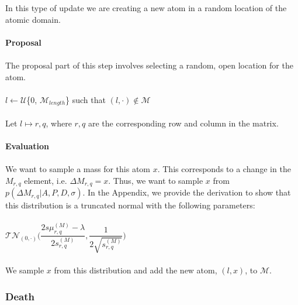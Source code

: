 \documentclass[]{article}
\begin{document}
In this type of update we are creating a new atom in a random location of the atomic domain.\\
\\
\textbf{Proposal}\\
\\
The proposal part of this step involves selecting a random, open location for the atom.\\
\\
$l \leftarrow \mathcal{U}$\{0, $\mathcal{M}_{length}$\} such that $(l, \cdot) \notin \mathcal{M}$\\
\\
Let $l \mapsto r,q$, where $r,q$ are the corresponding row and column in the matrix.\\
\\
\textbf{Evaluation}\\
\\
We want to sample a mass for this atom $x$. This corresponds to a change in the $M_{r,q}$ element, i.e. $\Delta M_{r,q} = x$. Thus, we want to sample $x$ from $p(\Delta M_{r,q} | A, P, D, \sigma)$. In the Appendix, we provide the derivation to show that this distribution is a truncated normal with the following parameters:\\
\\
$\mathcal{TN}_{(0,\cdot)}\biggr(\dfrac{2 s\mu_{r,q}^{(M)} - \lambda}{2s_{r,q}^{(M)}}, \dfrac{1}{2\sqrt{s_{r,q}^{(M)}}}\biggr)$\\
\\
We sample $x$ from this distribution and add the new atom, $(l, x)$, to $\mathcal{M}$.

\subsubsection{Death}
\end{document}

